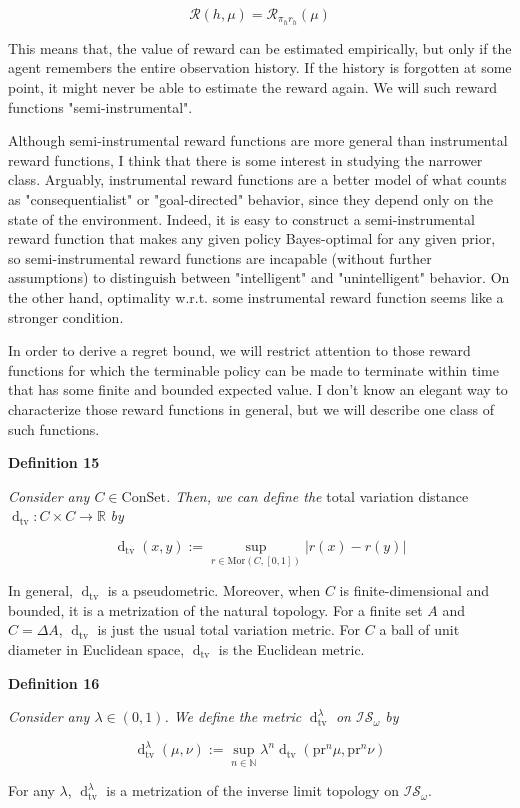 \documentclass[a4paper]{article}
\newcommand{\Co}[1]{}
\newcommand{\AP}[1]{\left(#1\right)}
\newcommand{\Dtv}{\operatorname{d}_{\text{tv}}}
\newcommand{\Nats}{\mathbb{N}}
\newcommand{\Reals}{\mathbb{R}}
\newcommand{\Mor}{\mathrm{Mor}}
\newcommand{\Abs}[1]{\left\vert #1 \right\vert}
\newcommand{\R}{\mathcal{R}}
\newcommand{\Con}{{\boldsymbol{\mathrm{ConSet}}}}
\newcommand{\IS}{\mathcal{IS}}
\newcommand{\Prj}{\mathrm{pr}}
\begin{document}
$$\R(h,\mu)=\R_{\pi_h r_h}(\mu)$$

This means that, the value of reward can be estimated empirically, but only if the agent remembers the entire observation history. If the history is forgotten at some point, it might never be able to estimate the reward again. We will such reward functions "semi-instrumental".

Although semi-instrumental reward functions are more general than instrumental reward functions, I think that there is some interest in studying the narrower class. Arguably, instrumental reward functions are a better model of what counts as "consequentialist" or "goal-directed" behavior, since they depend only on the state of the environment. Indeed, it is easy to construct a semi-instrumental reward function that makes any given policy Bayes-optimal for any given prior, so semi-instrumental reward functions are incapable (without further assumptions) to distinguish between "intelligent" and "unintelligent" behavior. On the other hand, optimality w.r.t. some instrumental reward function seems like a stronger condition.

In order to derive a regret bound, we will restrict attention to those reward functions for which the terminable policy can be made to terminate within time that has some finite and bounded expected value. I don't know an elegant way to characterize those reward functions in general, but we will describe one class of such functions.

\textbf{Definition 15}\Co{b}

\textit{Consider any $C\in\Con$. Then, we can define the} total variation distance $\Dtv:C\times C\rightarrow\Reals$ \textit{by}\Co{i}

$$\Dtv(x,y):=\sup_{r\in\Mor\AP{C,[0,1]}} \Abs{r(x)-r(y)}$$

In general, $\Dtv$ is a pseudometric. Moreover, when $C$ is finite-dimensional and bounded, it is a metrization of the natural topology. For a finite set $A$ and $C=\Delta A$, $\Dtv$ is just the usual total variation metric. For $C$ a ball of unit diameter in Euclidean space, $\Dtv$ is the Euclidean metric.

\textbf{Definition 16}\Co{b}

\textit{Consider any $\lambda\in(0,1)$. We define the metric} $\Dtv^\lambda$ \textit{on $\IS_\omega$ by}\Co{i}

$$\Dtv^\lambda(\mu,\nu):=\sup_{n\in\Nats}{\lambda^n\Dtv\AP{\Prj^n\mu,\Prj^n\nu}}$$

For any $\lambda$, $\Dtv^\lambda$ is a metrization of the inverse limit topology on $\IS_\omega$.
\end{document}
